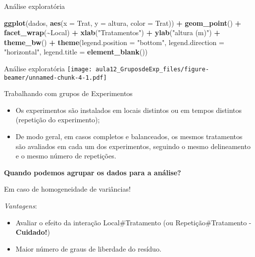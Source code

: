 \documentclass[
  ignorenonframetext,
]{beamer}
\newenvironment{Shaded}{\begin{snugshade}}{\end{snugshade}}
\newcommand{\AttributeTok}[1]{\textcolor[rgb]{0.13,0.29,0.53}{#1}}
\newcommand{\FunctionTok}[1]{\textcolor[rgb]{0.13,0.29,0.53}{\textbf{#1}}}
\newcommand{\NormalTok}[1]{#1}
\newcommand{\SpecialCharTok}[1]{\textcolor[rgb]{0.81,0.36,0.00}{\textbf{#1}}}
\newcommand{\StringTok}[1]{\textcolor[rgb]{0.31,0.60,0.02}{#1}}
\providecommand{\tightlist}{%
  \setlength{\itemsep}{0pt}\setlength{\parskip}{0pt}}
\begin{document}
\begin{frame}[fragile]{Análise exploratória}
\protect\hypertarget{anuxe1lise-exploratuxf3ria}{}
\begin{Shaded}
\begin{Highlighting}[]
\FunctionTok{ggplot}\NormalTok{(dados,}
       \FunctionTok{aes}\NormalTok{(}\AttributeTok{x =}\NormalTok{ Trat,}
           \AttributeTok{y =}\NormalTok{ altura,}
           \AttributeTok{color =}\NormalTok{ Trat)) }\SpecialCharTok{+} 
  \FunctionTok{geom\_point}\NormalTok{() }\SpecialCharTok{+}
  \FunctionTok{facet\_wrap}\NormalTok{(}\SpecialCharTok{\textasciitilde{}}\NormalTok{Local) }\SpecialCharTok{+}
  \FunctionTok{xlab}\NormalTok{(}\StringTok{"Tratamentos"}\NormalTok{) }\SpecialCharTok{+}
  \FunctionTok{ylab}\NormalTok{(}\StringTok{"altura (m)"}\NormalTok{) }\SpecialCharTok{+}
  \FunctionTok{theme\_bw}\NormalTok{() }\SpecialCharTok{+}
  \FunctionTok{theme}\NormalTok{(}\AttributeTok{legend.position =} \StringTok{"bottom"}\NormalTok{,}
        \AttributeTok{legend.direction =} \StringTok{"horizontal"}\NormalTok{,}
        \AttributeTok{legend.title =} \FunctionTok{element\_blank}\NormalTok{())}
\end{Highlighting}
\end{Shaded}
\end{frame}

\begin{frame}{Análise exploratória}
\protect\hypertarget{anuxe1lise-exploratuxf3ria-1}{}
\texttt{[image: aula12\_GruposdeExp\_files/figure-beamer/unnamed-chunk-4-1.pdf]}
\end{frame}

\begin{frame}{Trabalhando com grupos de Experimentos}
\protect\hypertarget{trabalhando-com-grupos-de-experimentos}{}
\begin{itemize}
\tightlist
\item
  Os experimentos são instalados em locais distintos ou em tempos
  distintos (repetição do experimento);
\item
  De modo geral, em casos completos e balanceados, os mesmos tratamentos
  são avaliados em cada um dos experimentos, seguindo o mesmo
  delineamento e o mesmo número de repetições.
\end{itemize}

\textbf{Quando podemos agrupar os dados para a análise?}

Em caso de homogeneidade de variâncias!

\emph{Vantagens}:

\begin{itemize}
\item
  Avaliar o efeito da interação Local\#Tratamento (ou
  Repetição\#Tratamento - \textbf{Cuidado!})
\item
  Maior número de graus de liberdade do resíduo.
\end{itemize}
\end{frame}
\end{document}
